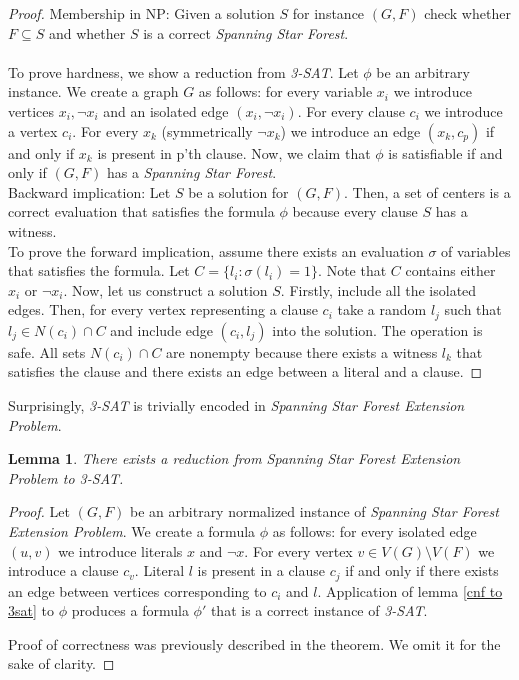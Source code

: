 \documentclass[en]{pracamgr}
\newtheorem{lemma}{Lemma}
\newcommand{\ssf}{\emph{Spanning Star Forest}}
\newcommand{\ssfe}{\emph{Spanning Star Forest Extension Problem}}
\newcommand{\tsat}{\emph{3-SAT}}
\begin{document}
\begin{proof}
	Membership in NP: Given a solution $S$ for instance $(G,F)$ check whether $F \subseteq S$ and whether $S$ is a correct \ssf{}.
	\\\\
	To prove hardness, we show a reduction from \tsat{}. Let $\phi$ be an arbitrary instance. We create a graph $G$ as follows: for every variable $x_i$ we introduce vertices $x_i,\neg x_i$ and an isolated edge $(x_i,\neg x_i)$. For every clause $c_i$ we introduce a vertex $c_i$. For every $x_k$ (symmetrically $\neg x_k$) we introduce an edge $(x_k,c_p)$ if and only if $x_k$ is present in p'th clause. Now, we claim that $\phi$ is satisfiable if and only if $(G, F)$ has a \ssf{}. \\
	Backward implication: Let $S$ be a solution for $(G,F)$. Then, a set of centers is a correct evaluation that satisfies the formula $\phi$ because every clause $S$ has a witness.\\
	To prove the forward implication, assume there exists an evaluation $\sigma$ of variables that satisfies the formula. Let $C = \{l_i: \sigma(l_i) = 1\} $. Note that $C$ contains either $x_i$ or $\neg x_i$. Now, let us construct a solution $S$. Firstly, include all the isolated edges. Then, for every vertex representing a clause $c_i$ take a random $l_j$ such that $l_j \in N(c_i) \cap C$ and include edge $(c_i, l_j)$ into the solution. The operation is safe. All sets $ N(c_i) \cap C$ are nonempty because there exists a witness $l_k$ that satisfies the clause and there exists an edge between a literal and a clause.
\end{proof}

Surprisingly, \tsat{} is trivially encoded in \ssfe{}.

 \label{cnf to 3sat}
\begin{lemma}
	There exists a reduction from \ssfe{} to \tsat.
\end{lemma}

\begin{proof}
	Let $(G,F)$ be an arbitrary normalized instance of \ssfe{}. We create a formula $\phi$ as follows: for every isolated edge $(u,v)$ we introduce literals $x$ and $\neg x$. For every vertex $v \in V(G)\setminus V(F)$ we introduce a clause $c_v$. Literal $l$ is present in a clause $c_j$ if and only if there exists an edge between vertices corresponding to $c_i$ and $l$. Application of lemma \ref{cnf to 3sat} to $\phi$ produces a formula $\phi'$ that is a correct instance of \tsat.
	
	Proof of correctness was previously described in the theorem. We omit it for the sake of clarity.
\end{proof}
\end{document}
